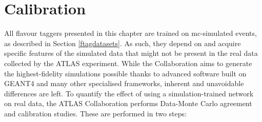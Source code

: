 \section{Calibration}\label{chap-calibration}
All flavour taggers presented in this chapter are trained on \gls{mc}-simulated events, as described in Section \ref{ftagdatasets}. As such, they depend on and acquire specific features of the simulated data that might not be present in the real data collected by the ATLAS experiment. While the Collaboration aims to generate the highest-fidelity simulations possible thanks to advanced software built on GEANT4 \cite{Agostinelli:602040} and many other specialised frameworks, inherent and unavoidable differences are left. To quantify the effect of using a simulation-trained network on real data, the ATLAS Collaboration performs Data-Monte Carlo agreement and calibration studies. These are performed in two steps: 
